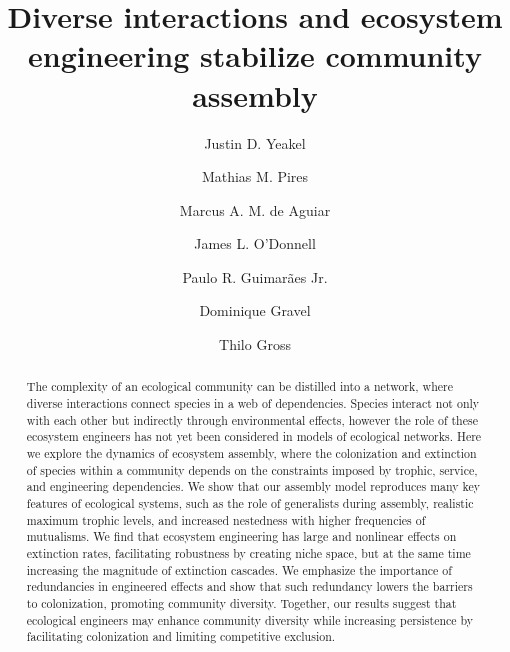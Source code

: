\documentclass[twocolumn,preprintnumbers,amsmath,amssymb,superscriptaddress]{revtex4}
\begin{document}
\title{Diverse interactions and ecosystem engineering stabilize community assembly} %



\author{Justin D. Yeakel}  

\author{Mathias M. Pires} 

\author{Marcus A. M. de Aguiar} 

\author{James L. O'Donnell} 

\author{Paulo R. Guimar\~aes Jr.} 

\author{Dominique Gravel} 

\author{Thilo Gross} 

\begin{abstract}
  The complexity of an ecological community can be distilled into a network, where diverse interactions connect species in a web of dependencies. Species interact not only with each other but indirectly through environmental effects, however the role of these ecosystem engineers has not yet been considered in models of ecological networks. Here we explore the dynamics of ecosystem assembly, where the colonization and extinction of species within a community depends on the constraints imposed by trophic, service, and engineering dependencies. We show that our assembly model reproduces many key features of ecological systems, such as the role of generalists during assembly, realistic maximum trophic levels, and increased nestedness with higher frequencies of mutualisms. We find that ecosystem engineering has large and nonlinear effects on extinction rates, facilitating robustness by creating niche space, but at the same time increasing the magnitude of extinction cascades. We emphasize the importance of redundancies in engineered effects and show that such redundancy lowers the barriers to colonization, promoting community diversity. Together, our results suggest that ecological engineers may enhance community diversity while increasing persistence by facilitating colonization and limiting competitive exclusion. 
\end{abstract}
\end{document}
